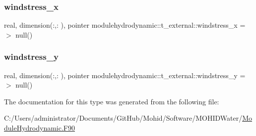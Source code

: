 \subsubsection{\texorpdfstring{windstress\+\_\+x}{windstress\_x}}
{\footnotesize\ttfamily real, dimension(\+:,\+:  ), pointer modulehydrodynamic\+::t\+\_\+external\+::windstress\+\_\+x =$>$ null()\hspace{0.3cm}{\ttfamily [private]}}

\mbox{\label{structmodulehydrodynamic_1_1t__external_a9670a19197119e8cecda52f493c49d52}} 
\subsubsection{\texorpdfstring{windstress\+\_\+y}{windstress\_y}}
{\footnotesize\ttfamily real, dimension(\+:,\+:  ), pointer modulehydrodynamic\+::t\+\_\+external\+::windstress\+\_\+y =$>$ null()\hspace{0.3cm}{\ttfamily [private]}}



The documentation for this type was generated from the following file\+:\begin{DoxyCompactItemize}
\item 
C\+:/\+Users/administrator/\+Documents/\+Git\+Hub/\+Mohid/\+Software/\+M\+O\+H\+I\+D\+Water/\mbox{\hyperlink{_module_hydrodynamic_8_f90}{Module\+Hydrodynamic.\+F90}}\end{DoxyCompactItemize}
